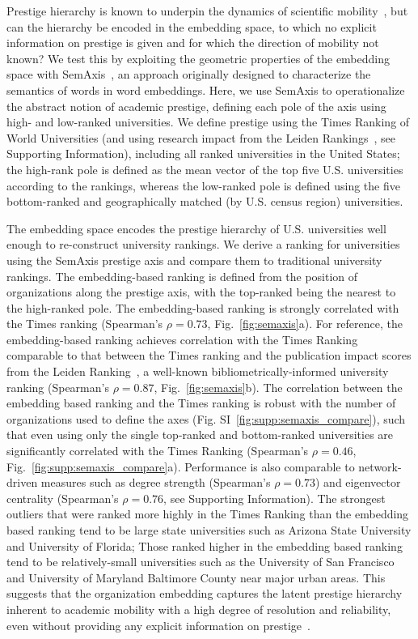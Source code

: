 \documentclass[12pt]{article} %
\def\SI{Supporting Information}
\begin{document}
Prestige hierarchy is known to underpin the dynamics of scientific mobility~\autocite{deville2014career, clauset2015hierarchy}, but can the hierarchy be encoded in the embedding space, to which no explicit information on prestige is given and for which the direction of mobility not known?
We test this by exploiting the geometric properties of the embedding space with SemAxis~\autocite{an2018semaxis}, an approach originally designed to characterize the semantics of words in word embeddings.
Here, we use SemAxis to operationalize the abstract notion of academic prestige, defining each pole of the axis using high- and low-ranked universities.
We define prestige using the Times Ranking of World Universities (and using research impact from the Leiden Rankings~\autocite{waltman2012leidenrankings}, see \SI), including all ranked universities in the United States;
the high-rank pole is defined as the mean vector of the top five U.S. universities according to the rankings, whereas the low-ranked pole is defined using the five bottom-ranked and geographically matched (by U.S. census region) universities.

The embedding space encodes the prestige hierarchy of U.S. universities well enough to re-construct university rankings. 
We derive a ranking for universities using the SemAxis prestige axis and compare them to traditional university rankings.
The embedding-based ranking is defined from the position of organizations along the prestige axis, with the top-ranked being the nearest to the high-ranked pole.
The embedding-based ranking is strongly correlated with the Times ranking (Spearman's $\rho = 0.73$, Fig.~\ref{fig:semaxis}a).
For reference, the embedding-based ranking achieves correlation with the Times Ranking comparable to that between the Times ranking and the publication impact scores from the Leiden Ranking~\autocite{waltman2012leidenrankings}, a well-known bibliometrically-informed university ranking (Spearman's $\rho = 0.87$, Fig.~\ref{fig:semaxis}b).
The correlation between the embedding based ranking and the Times ranking is robust with the number of organizations used to define the axes (Fig. SI~\ref{fig:supp:semaxis_compare}), such that even using only the single top-ranked and bottom-ranked universities are significantly correlated with the Times Ranking (Spearman's $\rho = 0.46$, Fig.~\ref{fig:supp:semaxis_compare}a).
Performance is also comparable to network-driven measures such as degree strength (Spearman's $\rho = 0.73$) and eigenvector centrality (Spearman's $\rho = 0.76$, see \SI). 
The strongest outliers that were ranked more highly in the Times Ranking than the embedding based ranking tend to be large state universities such as Arizona State University and  University of Florida;
Those ranked higher in the embedding based ranking tend to be relatively-small universities such as the University of San Francisco and University of Maryland Baltimore County near major urban areas.
This suggests that the organization embedding captures the latent prestige hierarchy inherent to academic mobility with a high degree of resolution and reliability, even without providing any explicit information on prestige~\autocite{deville2014career, clauset2015hierarchy}.
\end{document}

